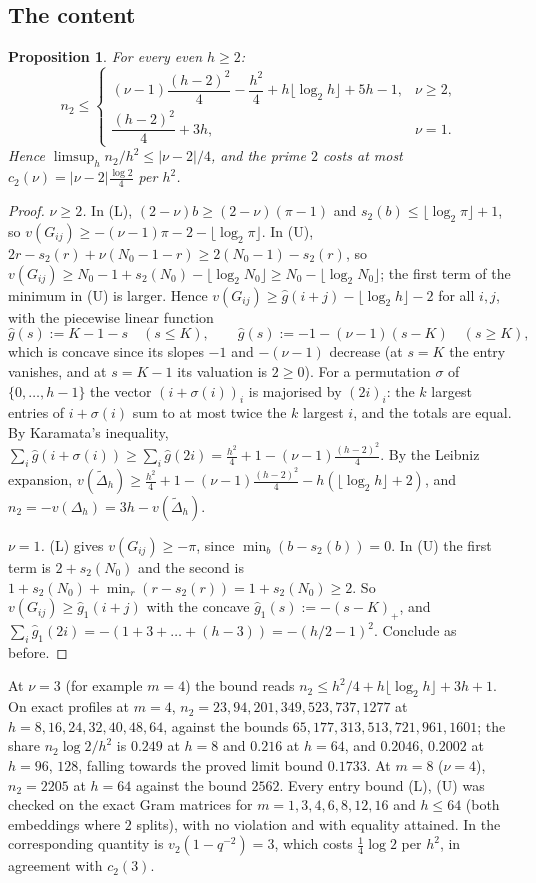 \documentclass[11pt]{amsart}
\newtheorem{proposition}[theorem]{Proposition}
\theoremstyle{definition}
\theoremstyle{remark}
\numberwithin{equation}{section}
\begin{document}
\subsection{The content}

\begin{proposition}\label{prop:ntwo}
For every even $h\ge2$:
\[
  n_2\le\begin{cases}(\nu-1)\dfrac{(h-2)^2}4-\dfrac{h^2}4+h\lfloor\log_2h\rfloor+5h-1,&\nu\ge2,\\[8pt]
  \dfrac{(h-2)^2}4+3h,&\nu=1.\end{cases}
\]
Hence $\limsup_hn_2/h^2\le|\nu-2|/4$, and the prime $2$ costs at most $c_2(\nu)=|\nu-2|\frac{\log2}4$ per $h^2$.
\end{proposition}

\begin{proof}
\emph{$\nu\ge2$.} In (L), $(2-\nu)b\ge(2-\nu)(\pi-1)$ and $s_2(b)\le\lfloor\log_2\pi\rfloor+1$, so
$v(G_{ij})\ge-(\nu-1)\pi-2-\lfloor\log_2\pi\rfloor$. In (U), $2r-s_2(r)+\nu(N_0-1-r)\ge2(N_0-1)-s_2(r)$, so
$v(G_{ij})\ge N_0-1+s_2(N_0)-\lfloor\log_2N_0\rfloor\ge N_0-\lfloor\log_2N_0\rfloor$; the first term of the minimum in (U)
is larger. Hence $v(G_{ij})\ge\hat g(i+j)-\lfloor\log_2h\rfloor-2$ for all $i,j$, with the piecewise linear function
\[
  \hat g(s):=K-1-s\quad(s\le K),\qquad \hat g(s):=-1-(\nu-1)(s-K)\quad(s\ge K),
\]
which is concave since its slopes $-1$ and $-(\nu-1)$ decrease (at $s=K$ the entry vanishes, and at $s=K-1$ its
valuation is $2\ge0$). For a permutation $\sigma$ of $\{0,\dots,h-1\}$ the vector $(i+\sigma(i))_i$ is majorised by
$(2i)_i$: the $k$ largest entries of $i+\sigma(i)$ sum to at most twice the $k$ largest $i$, and the totals are equal. By
Karamata's inequality, $\sum_i\hat g(i+\sigma(i))\ge\sum_i\hat g(2i)=\frac{h^2}4+1-(\nu-1)\frac{(h-2)^2}4$. By the
Leibniz expansion, $v(\tilde\Delta_h)\ge\frac{h^2}4+1-(\nu-1)\frac{(h-2)^2}4-h(\lfloor\log_2h\rfloor+2)$, and
$n_2=-v(\Delta_h)=3h-v(\tilde\Delta_h)$.

\emph{$\nu=1$.} (L) gives $v(G_{ij})\ge-\pi$, since $\min_b(b-s_2(b))=0$. In (U) the first term is $2+s_2(N_0)$ and the
second is $1+s_2(N_0)+\min_r(r-s_2(r))=1+s_2(N_0)\ge2$. So $v(G_{ij})\ge\hat g_1(i+j)$ with the concave
$\hat g_1(s):=-(s-K)_+$, and $\sum_i\hat g_1(2i)=-(1+3+\dots+(h-3))=-(h/2-1)^2$. Conclude as before.
\end{proof}

At $\nu=3$ (for example $m=4$) the bound reads $n_2\le h^2/4+h\lfloor\log_2h\rfloor+3h+1$. On exact profiles at $m=4$,
$n_2=23,94,201,349,523,737,1277$ at $h=8,16,24,32,40,48,64$, against the bounds $65,177,313,513,721,961,1601$; the
share $n_2\log2/h^2$ is $0.249$ at $h=8$ and $0.216$ at $h=64$, and $0.2046$, $0.2002$ at $h=96$, $128$, falling towards
the proved limit bound $0.1733$. At $m=8$ ($\nu=4$), $n_2=2205$ at $h=64$ against the bound $2562$. Every entry bound (L), (U)
was checked on the exact Gram matrices for $m=1,3,4,6,8,12,16$ and $h\le64$ (both embeddings where $2$ splits), with no
violation and with equality attained. In \cite{Chi2Paper} the corresponding quantity is $v_2(1-q^{-2})=3$, which costs
$\frac14\log2$ per $h^2$, in agreement with $c_2(3)$.
\end{document}
